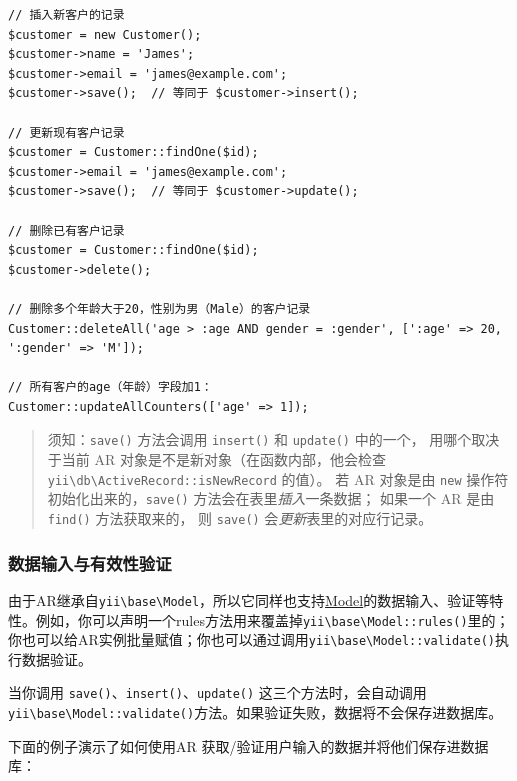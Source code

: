 \lstset{language=php}\begin{lstlisting}
// 插入新客户的记录
$customer = new Customer();
$customer->name = 'James';
$customer->email = 'james@example.com';
$customer->save();  // 等同于 $customer->insert();

// 更新现有客户记录
$customer = Customer::findOne($id);
$customer->email = 'james@example.com';
$customer->save();  // 等同于 $customer->update();

// 删除已有客户记录
$customer = Customer::findOne($id);
$customer->delete();

// 删除多个年龄大于20，性别为男（Male）的客户记录
Customer::deleteAll('age > :age AND gender = :gender', [':age' => 20, ':gender' => 'M']);

// 所有客户的age（年龄）字段加1：
Customer::updateAllCounters(['age' => 1]);
\end{lstlisting}
\begin{quote}须知：\lstinline|save()| 方法会调用 \lstinline|insert()| 和 \lstinline|update()| 中的一个，
用哪个取决于当前 AR 对象是不是新对象（在函数内部，他会检查 \texttt{yii{\allowbreak{}\textbackslash}db{\allowbreak{}\textbackslash}ActiveRecord\allowbreak{}::\allowbreak{}isNewRecord} 的值）。
若 AR 对象是由 \lstinline|new| 操作符 初始化出来的，\lstinline|save()| 方法会在表里\textit{插入}一条数据；
如果一个 AR 是由 \lstinline|find()| 方法获取来的，
则 \lstinline|save()| 会\textit{更新}表里的对应行记录。

\end{quote}
\subsubsection{数据输入与有效性验证}
由于AR继承自\texttt{yii{\allowbreak{}\textbackslash}base{\allowbreak{}\textbackslash}Model}，所以它同样也支持\hyperref[model.md]{Model}的数据输入、验证等特性。例如，你可以声明一个rules方法用来覆盖掉\texttt{yii{\allowbreak{}\textbackslash}base{\allowbreak{}\textbackslash}Model\allowbreak{}::\allowbreak{}rules()}里的；你也可以给AR实例批量赋值；你也可以通过调用\texttt{yii{\allowbreak{}\textbackslash}base{\allowbreak{}\textbackslash}Model\allowbreak{}::\allowbreak{}validate()}执行数据验证。

当你调用 \lstinline|save()|、\lstinline|insert()|、\lstinline|update()| 这三个方法时，会自动调用\texttt{yii{\allowbreak{}\textbackslash}base{\allowbreak{}\textbackslash}Model\allowbreak{}::\allowbreak{}validate()}方法。如果验证失败，数据将不会保存进数据库。

下面的例子演示了如何使用AR 获取/验证用户输入的数据并将他们保存进数据库：

